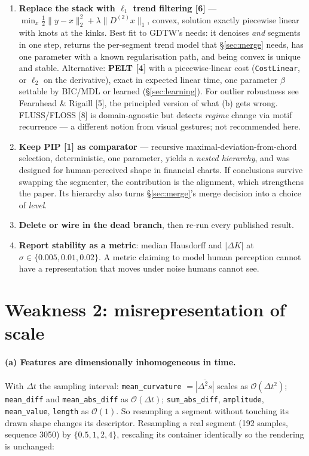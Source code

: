 \documentclass[11pt]{article}
\newcommand{\code}[1]{\texttt{\small #1}}
\begin{document}
\begin{enumerate}[leftmargin=*]
  \item \textbf{Replace the stack with $\ell_1$ trend filtering [6]} ---
  $\min_x \tfrac12\lVert y-x\rVert_2^2 + \lambda\lVert D^{(2)}x\rVert_1$, convex, solution
  exactly piecewise linear with knots at the kinks. Best fit to GDTW's needs: it denoises
  \emph{and} segments in one step, returns the per-segment trend model that
  \S\ref{sec:merge} needs, has one parameter with a known regularisation path, and being
  convex is unique and stable. Alternative: \textbf{PELT [4]} with a piecewise-linear cost
  (\code{CostLinear}, or $\ell_2$ on the derivative), exact in expected linear time, one
  parameter $\beta$ settable by BIC/MDL or learned (\S\ref{sec:learning}). For outlier
  robustness see Fearnhead \& Rigaill [5], the principled version of what (b) gets wrong.
  FLUSS/FLOSS [8] is domain-agnostic but detects \emph{regime} change via motif recurrence
  --- a different notion from visual gestures; not recommended here.
  \item \textbf{Keep PIP [1] as comparator} --- recursive maximal-deviation-from-chord
  selection, deterministic, one parameter, yields a \emph{nested hierarchy}, and was designed
  for human-perceived shape in financial charts. If conclusions survive swapping the
  segmenter, the contribution is the alignment, which strengthens the paper. Its hierarchy
  also turns \S\ref{sec:merge}'s merge decision into a choice of \emph{level}.
  \item \textbf{Delete or wire in the dead branch}, then re-run every published result.
  \item \textbf{Report stability as a metric}: median Hausdorff and $|\Delta K|$ at
  $\sigma \in \{0.005,0.01,0.02\}$. A metric claiming to model human perception cannot have a
  representation that moves under noise humans cannot see.
\end{enumerate}

\section{Weakness 2: misrepresentation of scale}
\label{sec:scale}

\paragraph{(a) Features are dimensionally inhomogeneous in time.} With $\Delta t$ the
sampling interval: \code{mean\_curvature} $= \overline{|\Delta^2 s|}$ scales as
$\mathcal{O}(\Delta t^{2})$; \code{mean\_diff} and \code{mean\_abs\_diff} as
$\mathcal{O}(\Delta t)$; \code{sum\_abs\_diff}, \code{amplitude}, \code{mean\_value},
\code{length} as $\mathcal{O}(1)$. So resampling a segment without touching its drawn shape
changes its descriptor. Resampling a real segment (192 samples, sequence 3050) by
$\{0.5,1,2,4\}$, rescaling its container identically so the rendering is unchanged:
\end{document}
